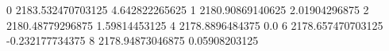 0 2183.532470703125 4.642822265625
1 2180.90869140625 2.01904296875
2 2180.48779296875 1.59814453125
4 2178.8896484375 0.0
6 2178.657470703125 -0.232177734375
8 2178.94873046875 0.05908203125

